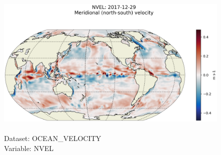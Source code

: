 \begin{figure}[H]
\centering
\includegraphics[scale=0.5]{../images/plots/latlon_plots/Ocean_Velocity/NVEL.png}
\caption{\\Dataset: OCEAN\_VELOCITY\\Variable: NVEL}
\label{tab:table-OCEAN_VELOCITY_NVEL-Plot}
\end{figure}
\pagebreak
